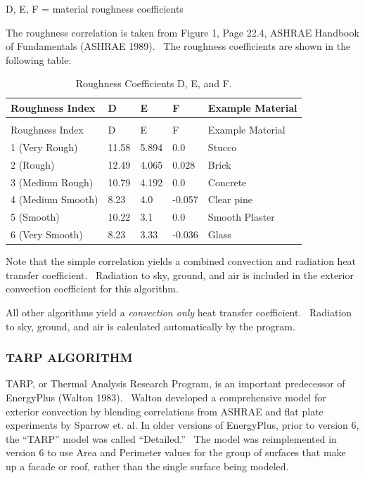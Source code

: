 D, E, F = material roughness coefficients

The roughness correlation is taken from Figure 1, Page 22.4, ASHRAE Handbook of Fundamentals (ASHRAE 1989).~ The roughness coefficients are shown in the following table:

\begin{longtable}[c]{@{}lllll@{}}
\caption{Roughness Coefficients D, E, and F. \label{table:roughness-coefficients-d-e-and-f.}} \tabularnewline
\toprule 
Roughness Index & D & E & F & Example Material \tabularnewline
\midrule
\endfirsthead

\caption[]{Roughness Coefficients D, E, and F.} \tabularnewline
\toprule 
Roughness Index & D & E & F & Example Material \tabularnewline
\midrule
\endhead

1 (Very Rough) & 11.58 & 5.894 & 0.0 & Stucco \tabularnewline
2 (Rough) & 12.49 & 4.065 & 0.028 & Brick \tabularnewline
3 (Medium Rough) & 10.79 & 4.192 & 0.0 & Concrete \tabularnewline
4 (Medium Smooth) & 8.23 & 4.0 & -0.057 & Clear pine \tabularnewline
5 (Smooth) & 10.22 & 3.1 & 0.0 & Smooth Plaster \tabularnewline
6 (Very Smooth) & 8.23 & 3.33 & -0.036 & Glass \tabularnewline
\bottomrule
\end{longtable}

Note that the simple correlation yields a combined convection and radiation heat transfer coefficient.~ Radiation to sky, ground, and air is included in the exterior convection coefficient for this algorithm.

All other algorithms yield a \emph{convection only} heat transfer coefficient.~ Radiation to sky, ground, and air is calculated automatically by the program.

\subsubsection{TARP ALGORITHM}\label{tarp-algorithm-000}

TARP, or Thermal Analysis Research Program, is an important predecessor of EnergyPlus (Walton 1983).~ Walton developed a comprehensive model for exterior convection by blending correlations from ASHRAE and flat plate experiments by Sparrow et. al. In older versions of EnergyPlus, prior to version 6, the ``TARP'' model was called ``Detailed.''~ The model was reimplemented in version 6 to use Area and Perimeter values for the group of surfaces that make up a facade or roof, rather than the single surface being modeled.

